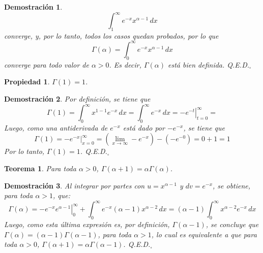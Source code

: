 \documentclass[a4paper,11pt]{article}
\theoremstyle{teoremas}
\newtheorem{teorema}{Teorema}[section]
\theoremstyle{ejemplos}
\theoremstyle{definiciones}
\theoremstyle{lemas}
\newtheorem*{propiedad}{Propiedad}
\newtheorem*{demostracion}{Demostraci\'on}
\begin{document}
\begin{demostracion}
 \begin{equation*}
  \int_1^{\infty} e^{-x} x^{\alpha - 1} \, dx
 \end{equation*}
 converge, y, por lo tanto, todos los casos quedan probados, por lo que
 \begin{equation*}
  \Gamma(\alpha) = \int_0^{\infty} e^{-x}x^{\alpha - 1} \, dx
 \end{equation*}
 converge para todo valor de $\alpha > 0$. Es decir, $\Gamma (\alpha)$ est\'a bien definida. Q.E.D.${}_{\square}$
\end{demostracion}

\begin{propiedad}
 $\Gamma(1) = 1$.
\end{propiedad}

\begin{demostracion}
 Por definici\'on, se tiene que
 \begin{equation*}
  \Gamma(1) = \int_0^{\infty} x^{1 - 1} e^{-x} \, dx = \int_{0}^{\infty} e^{-x} \, dx = \left. -e^{-t} \right|_{t=0}^{\infty} = 
 \end{equation*}
 Luego, como una antiderivada de $e^{-x}$ est\'a dado por $-e^{-x}$, se tiene que
 \begin{equation*}
  \Gamma(1) = \left. -e^{-x} \right|_{x=0}^{\infty} = \left( \lim_{x\to \infty} - e^{-x} \right) - \left( - e^{-0} \right) = 0 + 1 = 1
 \end{equation*}
 Por lo tanto, $\Gamma(1) = 1$. Q.E.D.${}_{\square}$
\end{demostracion}

\begin{teorema} \label{Teorema:GammaRecursiva}
 Para toda $\alpha > 0$, $\Gamma(\alpha + 1) = \alpha \Gamma(\alpha)$.
\end{teorema}

\begin{demostracion}
 Al integrar por partes con $u = x^{\alpha - 1}$ y $dv = e^{-x}$, se obtiene, para toda $\alpha > 1$, que:
 \begin{equation*}
  \Gamma(\alpha) = \left. -e^{-x}e^{\alpha - 1} \right|_{0}^{\infty} + \int_{0}^{\infty} e^{-x}(\alpha - 1)x^{\alpha-2}\, dx = (\alpha-1) \int_0^{\infty} x^{\alpha - 2}e^{-x} \, dx
 \end{equation*}
 Luego, como esta \'ultima expresi\'on es, por definici\'on, $\Gamma(\alpha - 1)$, se concluye que $\Gamma(\alpha)=(\alpha-1)\Gamma(\alpha-1)$, para toda $\alpha > 1$, lo cual es equivalente a que para toda $\alpha > 0$, $\Gamma(\alpha+1) = \alpha\Gamma(\alpha-1)$. Q.E.D.${}_{\square}$
\end{demostracion}
\end{document}
